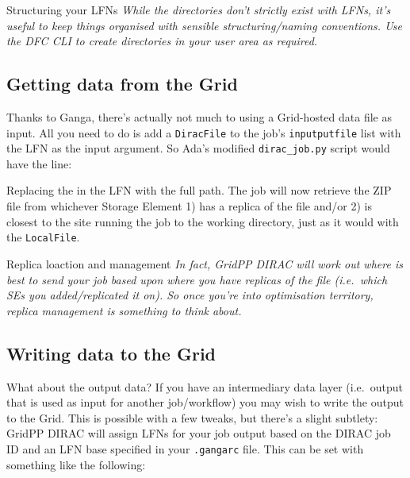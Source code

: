 \begin{infobox}{Structuring your LFNs}
\emph{While the directories don't strictly exist with LFNs, it's useful to
keep things organised with sensible structuring/naming conventions. Use
the DFC CLI to create directories in your user area as required.}
\end{infobox}

\subsection{Getting data from the Grid}
\label{getting-data-from-the-grid}
Thanks to Ganga, there's actually not much to using a Grid-hosted data
file as input. All you need to do is add a \texttt{DiracFile} to the
job's \texttt{inputputfile} list with the LFN as the input argument. So
Ada's modified \texttt{dirac\_job.py} script would have the line:

\begin{Shaded}
\begin{Highlighting}[]
 \NormalTok{= [ DiracFile(}\NormalTok{) ]}
\end{Highlighting}
\end{Shaded}

Replacing the  in the LFN with the full path.
The job will now retrieve the ZIP file from whichever Storage Element 1)
has a replica of the file and/or 2) is closest to the site running the
job to the working directory, just as it would with the
\texttt{LocalFile}.

\begin{infobox}{Replica loaction and management}
\emph{In fact, GridPP DIRAC will work out where is best to send your job based
upon where you have replicas of the file (i.e.~which SEs you
added/replicated it on). So once you're into optimisation territory,
replica management is something to think about.}
\end{infobox}

\subsection{Writing data to the Grid}
\label{writing-data-to-the-grid}
What about the output data? If you have an intermediary data layer
(i.e.~output that is used as input for another job/workflow) you may
wish to write the output to the Grid. This is possible with a few
tweaks, but there's a slight subtlety: GridPP DIRAC will assign LFNs for
your job output based on the DIRAC job ID and an LFN base specified in
your \texttt{.gangarc} file. This can be set with something like the
following:

